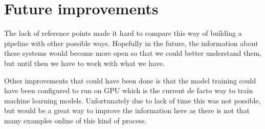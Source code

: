 \section{Future improvements}

The lack of reference points made it hard to compare this way of building a pipeline with other possible ways.
Hopefully in the future, the information about these systems would become more open so that we could better understand them, but until then we have to work with what we have.

Other improvements that could have been done is that the model training could have been configured to run on GPU which is the current de facto way to train machine learning models.
Unfortunately due to lack of time this was not possible, but would be a great way to improve the information here as there is not that many examples online of this kind of process.





